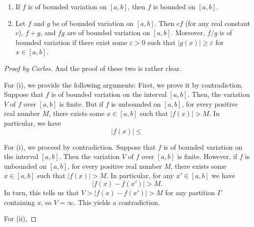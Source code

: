 \begin{theorem}[2.1]
\begin{enumerate}[label=\textnormal{(\roman*)}]
\item If $f$ is of bounded variation on $[a,b]$, then $f$ is bounded on
  $[a,b]$.
\item Let $f$ and $g$ be of bounded variation on $[a,b]$. Then $cf$ (for
  any real constant $c$), $f+g$, and $fg$ are of bounded variation on
  $[a,b]$. Moreover, $f/g$ is of bounded variation if there exist some
  $\varepsilon>0$ such that $|g(x)|\geq\varepsilon$ for $x\in[a,b]$.
\end{enumerate}
\end{theorem}
\begin{proof}[Proof by Carlos]
And the proof of these two is rather clear.

For (i), we provide the following arguments: First, we prove it by
contradiction. Suppose that $f$ is of bounded variation on the interval
$[a,b]$. Then, the variation $V$ of $f$ over $[a,b]$ is finite. But if $f$
is unbounded on $[a,b]$, for every positive real number $M$, there exists
some $x\in[a,b]$ such that $|f(x)|>M$. In particular, we have
\[
|f(x)|\leq
\]

For (i), we proceed by contradiction. Suppose that $f$ is of bounded
variation on the interval $[a,b]$. Then the variation $V$ of $f$ over
$[a,b]$ is finite. However, if $f$ is unbounded on $[a,b]$, for every
positive real number $M$, there exists some $x\in[a,b]$ such that
$|f(x)|>M$. In particular, for any $x'\in [a,b]$ we have
\[
|f(x)-f(x')|>M.
\]
In turn, this tells us that $V>|f(x)-f(x')|>M$ for any partition $\Gamma$
containing $x$, so $V=\infty$. This yields a contradiction.

For (ii),
\end{proof}

